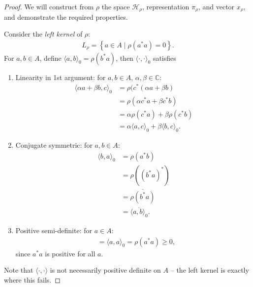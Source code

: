 \documentclass[11pt,a4paper]{report}
\theoremstyle{plain}
\theoremstyle{definition}
\newcommand{\1}{\mathbbm{1}}
\newcommand{\Hr}{\mathcal{H}_\rho}
\begin{document}
\begin{proof}
	We will construct from $\rho$ the space $\Hr$,  representation $\pi_\rho$, 
	and vector $x_\rho$, and demonstrate the required properties.
	
	Consider the \emph{left kernel} of $\rho$:
	\begin{align*}
		L_\rho = \left\{a \in A \mid \rho (a ^\ast a) = 0 \right\}.
	\end{align*}	
	For $a,b \in A$, define $\langle a , b \rangle_0 = \rho(b^\ast a)$, then 
	$\langle \cdot, \cdot \rangle_0$ satisfies
	\begin{enumerate}
	  \item Linearity in 1st argument: for $a,b\in A$, $\alpha, \beta \in \mathbb{C}$:
		\begin{align*}
		   \langle \alpha a + \beta b, c \rangle_0 
		&= \rho (c^\ast(\alpha a + \beta b)   								\\
		&= \rho (\alpha c^\ast a + \beta c^\ast b)  						\\
		&= \alpha \rho (c^\ast a) + \beta \rho (c^\ast b)					\\
		&= \alpha \langle a , c \rangle_0 + \beta \langle b, c \rangle_0.
		\end{align*}
	  \item Conjugate symmetric: for $a,b \in A$:
	  	\begin{align*}
	  	   \langle b,a \rangle _0 
	  	&= \rho (a^\ast b)													\\
	  	&= \rho ((b^\ast a)^\ast)											\\
	  	&= \overline{\rho (b^\ast a)}										\\
	  	&= \overline{\langle a,b \rangle _0 }.
	  	\end{align*}
	  \item Positive semi-definite: for $a \in A$:
	  	\begin{align*}
	  	&=	\langle a,a\rangle_0 = \rho(a^\ast a) \geq 0,
	  	\end{align*}
	  	since $a^\ast a$ is positive for all $a$.
	\end{enumerate}
	Note that $\langle \cdot, \cdot \rangle$ is not necessarily positive definite on 
	$A$ -- the left kernel is exactly where this fails.
	

\end{proof}
\end{document}
